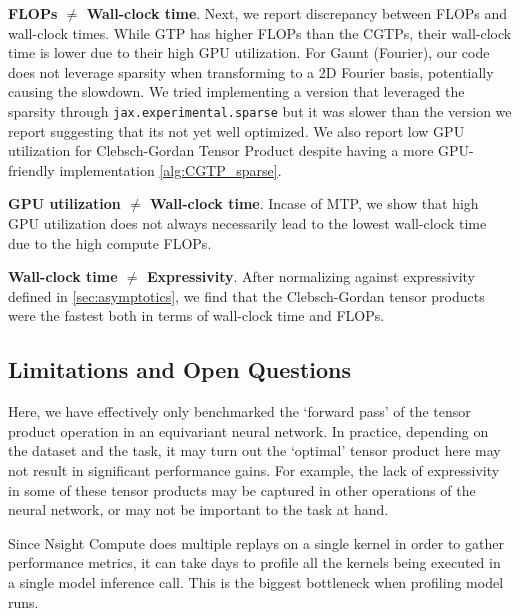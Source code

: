 \documentclass{article}
\theoremstyle{definition}
\theoremstyle{remark}
\begin{document}


\textbf{FLOPs $\neq$ Wall-clock time}. Next, we report discrepancy between FLOPs and wall-clock times. While GTP has higher FLOPs than the CGTPs, their wall-clock time is lower due to their high GPU utilization. For Gaunt (Fourier), our code does not leverage sparsity when transforming to a 2D Fourier basis, potentially causing the slowdown. We tried implementing a version that leveraged the sparsity through \texttt{jax.experimental.sparse} but it was slower than the version we report suggesting that its not yet well optimized. We also report low GPU utilization for Clebsch-Gordan Tensor Product despite having a more GPU-friendly implementation \autoref{alg:CGTP_sparse}. 

\textbf{GPU utilization $\neq$ Wall-clock time}. Incase of MTP, we show that high GPU utilization does not always necessarily lead to the lowest wall-clock time due to the high compute FLOPs.

\textbf{Wall-clock time $\neq$ Expressivity}. After normalizing against expressivity defined in \autoref{sec:asymptotics}, we find that the Clebsch-Gordan tensor products were the fastest both in terms of wall-clock time and FLOPs.

\subsection{Limitations and Open Questions}
Here, we have effectively only benchmarked the `forward pass' of the tensor product operation in an equivariant neural network. In practice, depending on the dataset and the task, it may turn out the `optimal' tensor product here may not result in significant performance gains. For example, the lack of expressivity in some of these tensor products may be captured in other operations of the neural network, or may not be important to the task at hand. 

Since Nsight Compute does multiple replays on a single kernel in order to gather performance metrics, it can take days to profile all the kernels being executed in a single model inference call. This is the biggest bottleneck when profiling model runs.
\end{document}

